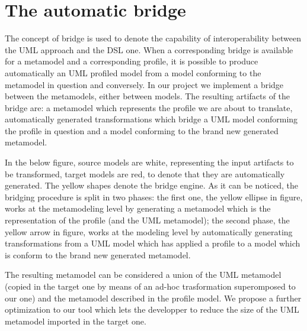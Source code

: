 \section{The automatic bridge}\label{sec:framework}


The concept of bridge is used to denote the capability of interoperability between the UML approach and the DSL one. When a corresponding bridge is available for a metamodel and a corresponding profile, it is possible to produce automatically an UML profiled model from a model conforming to the metamodel in question and conversely. In our project we implement a bridge between the metamodels, either between models. The resulting artifacts of the bridge are: a metamodel which represents the profile we are about to translate,  automatically generated transformations which bridge a UML model conforming the profile in question and a model conforming to the brand new generated metamodel.


In the below figure,  source models are white, representing the input artifacts to be transformed, target models are red, to denote that they are automatically generated. The yellow shapes denote the bridge engine. As it can be noticed, the bridging procedure is split in two phases: the first one, the yellow ellipse in figure, works at the metamodeling level by generating a metamodel which is the representation of the profile (and the UML metamodel); the second phase, the yellow arrow in figure, works at the modeling level by automatically generating transformations from a UML model which has applied a profile to a model which is conform to the brand new generated metamodel.


The resulting metamodel can be considered a union of the UML metamodel (copied in the target one by means of an ad-hoc trasformation superomposed to our one) and the metamodel described in the profile model. We propose a further optimization to our tool which lets the developper to reduce the size of the UML metamodel imported in the target one.

